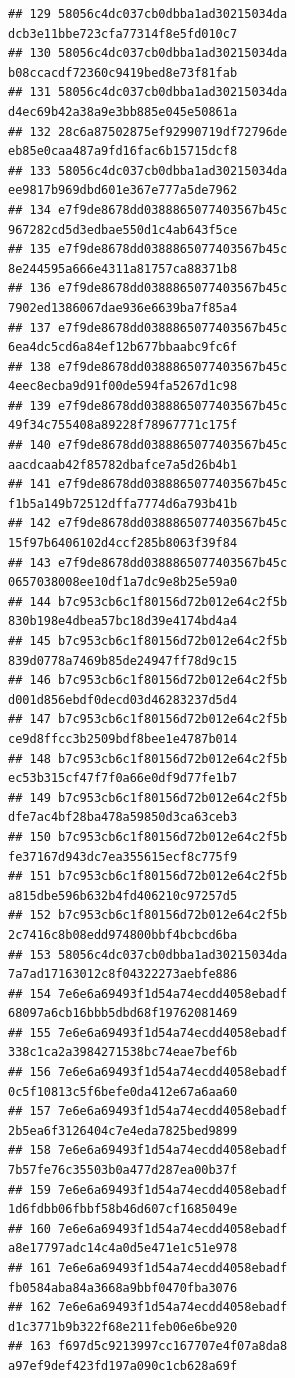 \documentclass[]{article}
\begin{document}
\begin{verbatim}
## 129 58056c4dc037cb0dbba1ad30215034da   dcb3e11bbe723cfa77314f8e5fd010c7
## 130 58056c4dc037cb0dbba1ad30215034da   b08ccacdf72360c9419bed8e73f81fab
## 131 58056c4dc037cb0dbba1ad30215034da   d4ec69b42a38a9e3bb885e045e50861a
## 132 28c6a87502875ef92990719df72796de   eb85e0caa487a9fd16fac6b15715dcf8
## 133 58056c4dc037cb0dbba1ad30215034da   ee9817b969dbd601e367e777a5de7962
## 134 e7f9de8678dd0388865077403567b45c   967282cd5d3edbae550d1c4ab643f5ce
## 135 e7f9de8678dd0388865077403567b45c   8e244595a666e4311a81757ca88371b8
## 136 e7f9de8678dd0388865077403567b45c   7902ed1386067dae936e6639ba7f85a4
## 137 e7f9de8678dd0388865077403567b45c   6ea4dc5cd6a84ef12b677bbaabc9fc6f
## 138 e7f9de8678dd0388865077403567b45c   4eec8ecba9d91f00de594fa5267d1c98
## 139 e7f9de8678dd0388865077403567b45c   49f34c755408a89228f78967771c175f
## 140 e7f9de8678dd0388865077403567b45c   aacdcaab42f85782dbafce7a5d26b4b1
## 141 e7f9de8678dd0388865077403567b45c   f1b5a149b72512dffa7774d6a793b41b
## 142 e7f9de8678dd0388865077403567b45c   15f97b6406102d4ccf285b8063f39f84
## 143 e7f9de8678dd0388865077403567b45c   0657038008ee10df1a7dc9e8b25e59a0
## 144 b7c953cb6c1f80156d72b012e64c2f5b   830b198e4dbea57bc18d39e4174bd4a4
## 145 b7c953cb6c1f80156d72b012e64c2f5b   839d0778a7469b85de24947ff78d9c15
## 146 b7c953cb6c1f80156d72b012e64c2f5b   d001d856ebdf0decd03d46283237d5d4
## 147 b7c953cb6c1f80156d72b012e64c2f5b   ce9d8ffcc3b2509bdf8bee1e4787b014
## 148 b7c953cb6c1f80156d72b012e64c2f5b   ec53b315cf47f7f0a66e0df9d77fe1b7
## 149 b7c953cb6c1f80156d72b012e64c2f5b   dfe7ac4bf28ba478a59850d3ca63ceb3
## 150 b7c953cb6c1f80156d72b012e64c2f5b   fe37167d943dc7ea355615ecf8c775f9
## 151 b7c953cb6c1f80156d72b012e64c2f5b   a815dbe596b632b4fd406210c97257d5
## 152 b7c953cb6c1f80156d72b012e64c2f5b   2c7416c8b08edd974800bbf4bcbcd6ba
## 153 58056c4dc037cb0dbba1ad30215034da   7a7ad17163012c8f04322273aebfe886
## 154 7e6e6a69493f1d54a74ecdd4058ebadf   68097a6cb16bbb5dbd68f19762081469
## 155 7e6e6a69493f1d54a74ecdd4058ebadf   338c1ca2a3984271538bc74eae7bef6b
## 156 7e6e6a69493f1d54a74ecdd4058ebadf   0c5f10813c5f6befe0da412e67a6aa60
## 157 7e6e6a69493f1d54a74ecdd4058ebadf   2b5ea6f3126404c7e4eda7825bed9899
## 158 7e6e6a69493f1d54a74ecdd4058ebadf   7b57fe76c35503b0a477d287ea00b37f
## 159 7e6e6a69493f1d54a74ecdd4058ebadf   1d6fdbb06fbbf58b46d607cf1685049e
## 160 7e6e6a69493f1d54a74ecdd4058ebadf   a8e17797adc14c4a0d5e471e1c51e978
## 161 7e6e6a69493f1d54a74ecdd4058ebadf   fb0584aba84a3668a9bbf0470fba3076
## 162 7e6e6a69493f1d54a74ecdd4058ebadf   d1c3771b9b322f68e211feb06e6be920
## 163 f697d5c9213997cc167707e4f07a8da8   a97ef9def423fd197a090c1cb628a69f

\end{verbatim}
\end{document}
